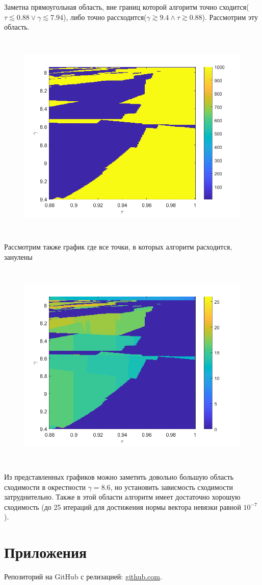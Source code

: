 \documentclass[12pt,a4paper]{scrartcl}
\begin{document}
Заметна прямоугольная область, вне границ которой алгоритм точно сходится($\tau \lesssim 0.88 \vee  \gamma \lesssim 7.94$), либо точно рассходится($\gamma \gtrsim 9.4 \wedge \tau \gtrsim 0.88$). Рассмотрим эту область.

\begin{figure}[H]
    \centering
    \includegraphics[width=14cm, height=10cm]{fig/2.png}
\end{figure}

Рассмотрим также график где все точки, в которых алгоритм расходится, занулены

\begin{figure}[H]
    \centering
    \includegraphics[width=14cm, height=10cm]{fig/3.png}
\end{figure}

Из представленных графиков можно заметить довольно большую область сходимости в окрестности $\gamma = 8.6$, но установить зависмость сходимости затруднительно. Также в этой области алгоритм имеет достаточно хорошую сходимость (до 25 итераций для достижения нормы вектора невязки равной $10^{-7}$).

\section{Приложения}
Репозиторий на GitHub с релизацией: \href{https://github.com/WiillyWonka/Intervals}{github.com}.
\end{document}

